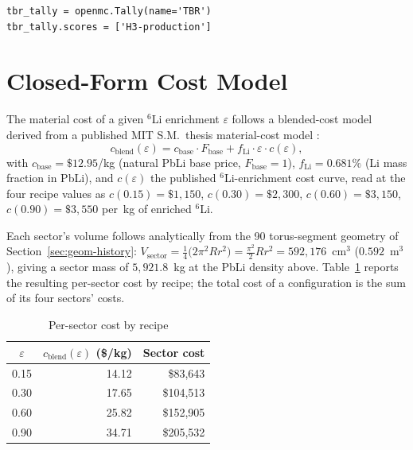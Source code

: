 \documentclass[11pt]{article}
\begin{document}
\begin{lstlisting}[style=pystyle]
tbr_tally = openmc.Tally(name='TBR')
tbr_tally.scores = ['H3-production']
\end{lstlisting}

\section{Closed-Form Cost Model}
\label{sec:cost}

The material cost of a given $^6$Li enrichment $\varepsilon$ follows a
blended-cost model derived from a published MIT S.M.\ thesis material-cost
model \cite{webber2025}:
\[
c_{\mathrm{blend}}(\varepsilon) = c_{\mathrm{base}}\cdot F_{\mathrm{base}} + f_{\mathrm{Li}}\cdot\varepsilon\cdot c(\varepsilon),
\]
with $c_{\mathrm{base}}=\$12.95$/kg (natural PbLi base price, $F_{\mathrm{base}}=1$),
$f_{\mathrm{Li}}=0.681\%$ (Li mass fraction in PbLi), and $c(\varepsilon)$ the
published $^6$Li-enrichment cost curve, read at the four recipe values as
$c(0.15){=}\$1{,}150$, $c(0.30){=}\$2{,}300$, $c(0.60){=}\$3{,}150$,
$c(0.90){=}\$3{,}550$ per~kg of enriched $^6$Li.

Each sector's volume follows analytically from the 90\textdegree{} torus-segment
geometry of Section~\ref{sec:geom-history}: $V_{\mathrm{sector}} = \tfrac{1}{4}\bigl(2\pi^2 R r^2\bigr) = \tfrac{\pi^2}{2}Rr^2 = 592{,}176$~cm$^3$
($0.592$~m$^3$), giving a sector mass of $5{,}921.8$~kg at the PbLi density
above. Table~\ref{t:cost} reports the resulting per-sector cost by recipe;
the total cost of a configuration is the sum of its four sectors' costs.

\begin{table}[h]
\centering
\caption{Per-sector cost by recipe}\label{t:cost}
\begin{tabular}{crr}
\toprule
$\varepsilon$ & $c_{\mathrm{blend}}(\varepsilon)$ (\$/kg) & Sector cost \\
\midrule
0.15 & 14.12 & \$83,643 \\
0.30 & 17.65 & \$104,513 \\
0.60 & 25.82 & \$152,905 \\
0.90 & 34.71 & \$205,532 \\
\bottomrule
\end{tabular}
\end{table}

\end{document}

